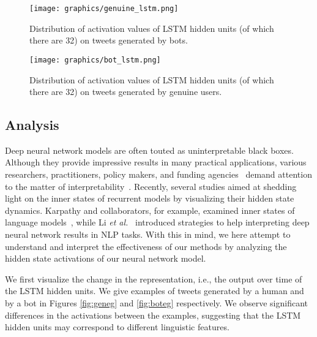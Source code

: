 \begin{figure*}[t]
\begin{center}
\texttt{[image: graphics/genuine\_lstm.png]} 
\caption{Distribution of activation values of LSTM hidden units (of which there are 32) on tweets generated by bots.}\label{fig:gendist}
\end{center}
\end{figure*}



\begin{figure*}[t]
\begin{center}
\texttt{[image: graphics/bot\_lstm.png]} 
\caption{Distribution of activation values of LSTM hidden units (of which there are 32) on tweets generated by genuine users.}\label{fig:botdist}
\end{center}
\end{figure*}


\subsection{Analysis}

Deep neural network models are often touted as uninterpretable black boxes. Although they provide impressive results in many practical applications, various researchers, practitioners, policy makers, and funding agencies~\cite{socialsim} demand attention to the matter of interpretability~\cite{samek2017explainable}. Recently,  several studies aimed at shedding light on the inner states of recurrent models by visualizing their hidden state dynamics. Karpathy and collaborators, for example, examined inner states of language models~\cite{karpathy2015visualizing}, while Li \textit{et al.}~\cite{li2015visualizing} introduced strategies to help interpreting deep neural network results in NLP tasks. With this in mind, we here attempt to understand and interpret the effectiveness of our methods by analyzing the hidden state activations of our neural network model. \par  

We first visualize the change in the representation, i.e., the output over time of the LSTM hidden units. We give examples of tweets generated by a human and by a bot in Figures \ref{fig:geneg} and \ref{fig:boteg} respectively. We observe significant differences in the activations between the examples, suggesting that the LSTM hidden units may correspond to different linguistic features. \par 





